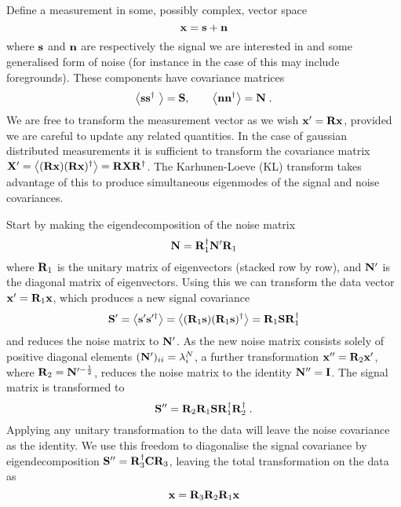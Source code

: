 \documentclass{revtex4}
\newcommand{\la}{\ensuremath{\left\langle}}
\newcommand{\ra}{\ensuremath{\right\rangle}}
\begin{document}
Define a measurement in some, possibly complex, vector space
\begin{equation}
\mathbf{x} = \mathbf{s} + \mathbf{n}
\end{equation}
where $\mathbf{s}$ and $\mathbf{n}$ are respectively the signal we are interested in and some
generalised form of noise (for instance in the case of \tcm this may
include foregrounds). These components have covariance matrices
\begin{equation}
\la \vs \vs^\hconj\ \ra = \mS, \qquad \la \vn \vn^\hconj \ra = \mN \; .
\end{equation}
We are free to transform the measurement vector as we wish $\mathbf{x}' = \mathbf{R}\mathbf{x}$, provided
we are careful to update any related quantities. In the case of
gaussian distributed measurements it is sufficient to transform the
covariance matrix $\mat{X}' = \la (\mR \vx) (\mR \vx)^\hconj \ra  =
\mR \mat{X}\mR^\hconj$. The Karhunen-Loeve (KL) transform takes
advantage of this to produce simultaneous eigenmodes of the signal and
noise covariances.

Start by making the eigendecomposition of the noise matrix
\begin{equation}
\mathbf{N} = \mathbf{R}_1^{\dagger} \mathbf{N}' \mathbf{R}_1
\end{equation}
where $\mathbf{R}_1$ is the unitary matrix of eigenvectors (stacked row by
row), and $\mathbf{N}'$ is the diagonal matrix of eigenvectors. Using this we
can transform the data vector $\mathbf{x}' = \mathbf{R}_1 \mathbf{x}$, which produces a new
signal covariance
\begin{equation}
\mS' = \la \vs' \vs'^\hconj \ra = \la (\mR_1 \vs)  (\mR_1 \vs)^\hconj
\ra = \mR_1 \mS \mR_1^\hconj
\end{equation}
and reduces the noise matrix to $\mathbf{N}'$. As the new noise matrix
consists solely of positive diagonal elements $(\mathbf{N}')_{ii} =
\lambda^N_i$, a further transformation $\mathbf{x}'' = \mathbf{R}_2 \mathbf{x}'$, where
$\mathbf{R}_2 = \mathbf{N}'^{-\frac{1}{2}}$, reduces the noise matrix to the identity
$\mathbf{N}'' = \mathbf{I}$. The signal matrix is transformed to
\begin{equation}
\mathbf{S}'' = \mathbf{R}_2 \mathbf{R}_1 \mathbf{S} \mathbf{R}_1^{\dagger} \mathbf{R}_2^{\dagger} \; .
\end{equation}
Applying any unitary transformation to the data will leave the noise
covariance as the identity. We use this freedom to diagonalise the
signal covariance by eigendecomposition $\mathbf{S}'' = \mathbf{R}_3^{\dagger} \mathbf{C}
\mathbf{R}_3$, leaving the total transformation on the data as
\begin{equation}
\mathbf{x} = \mathbf{R}_3 \mathbf{R}_2 \mathbf{R}_1 \mathbf{x}
\end{equation}
\end{document}
